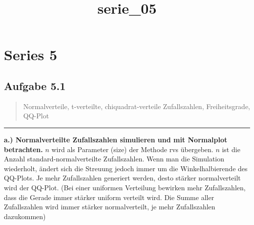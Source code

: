 \documentclass[11pt]{article}
\title{serie\_05}
\begin{document}
    
    
    \maketitle
    
    

    
    \section{Series 5}\label{series-5}

    \subsection{Aufgabe 5.1}\label{aufgabe-5.1}

\begin{quote}
Normalverteile, t-verteilte, chiquadrat-verteile Zufallszahlen,
Freiheitsgrade, QQ-Plot
\end{quote}

    \begin{center}\rule{0.5\linewidth}{\linethickness}\end{center}

\textbf{a.) Normalverteilte Zufallszahlen simulieren und mit Normalplot
betrachten.} \(n\) wird als Parameter (size) der Methode rvs übergeben.
\(n\) ist die Anzahl standard-normalverteilte Zufallszahlen. Wenn man
die Simulation wiederholt, ändert sich die Streuung jedoch immer um die
Winkelhalbierende des QQ-Plots. Je mehr Zufallszahlen generiert werden,
desto stärker normalverteilt wird der QQ-Plot. (Bei einer uniformen
Verteilung bewirken mehr Zufallszahlen, dass die Gerade immer stärker
uniform verteilt wird. Die Summe aller Zufallszahlen wird immer stärker
normalverteilt, je mehr Zufallszahlen dazukommen)
\end{document}
